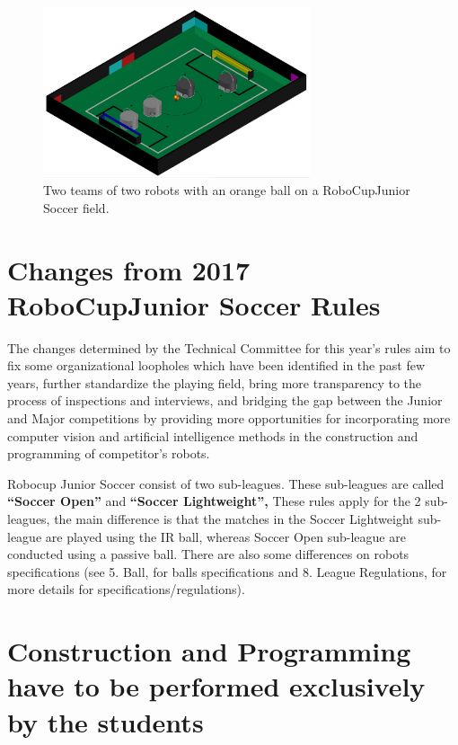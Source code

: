 \documentclass{article}
\begin{document}
\begin{figure}[H]
    \centering
    \includegraphics[width=0.7\textwidth]{media/image1.jpeg}
    \caption{Two teams of two robots with an orange ball on a RoboCupJunior
        Soccer field.}
    \label{fig:name}
\end{figure}



\section*{Changes from 2017 RoboCupJunior Soccer Rules}

The changes determined by the Technical Committee for this year's rules aim to fix some organizational loopholes which have been identified in the past few years, further standardize the playing field, bring more transparency to the process of inspections and interviews, and bridging the gap between the Junior and Major competitions by providing more opportunities for incorporating more computer vision and artificial intelligence methods in the construction and programming of competitor's robots.

Robocup Junior Soccer consist of two sub-leagues. These sub-leagues are called \textbf{``Soccer Open''} and \textbf{``Soccer Lightweight'',} These rules apply for the 2 sub-leagues, the main difference is that the matches in the Soccer Lightweight sub-league are played using the IR ball, whereas Soccer Open sub-league are conducted using a passive ball. There are also some differences on robots specifications (see 5. Ball, for balls specifications and 8. League Regulations, for more details for specifications/regulations).

\listofchanges

\section*{Construction and Programming have to be performed exclusively by the students}
\end{document}
